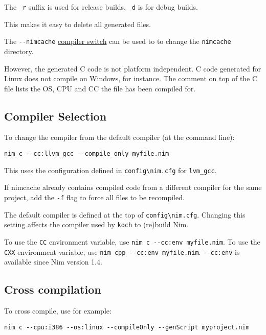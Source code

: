 The \texttt{\_r} suffix is used for release builds, \texttt{\_d} is for
debug builds.

This makes it easy to delete all generated files.

The \texttt{-\/-nimcache}
\protect\hyperlink{compiler-usage-command-line-switches}{compiler
switch} can be used to to change the \texttt{nimcache} directory.

However, the generated C code is not platform independent. C code
generated for Linux does not compile on Windows, for instance. The
comment on top of the C file lists the OS, CPU and CC the file has been
compiled for.

\hypertarget{compiler-selection}{%
\subsection{Compiler Selection}\label{compiler-selection}}

To change the compiler from the default compiler (at the command line):

\begin{verbatim}
nim c --cc:llvm_gcc --compile_only myfile.nim
\end{verbatim}

This uses the configuration defined in
\texttt{config\textbackslash{}nim.cfg} for \texttt{lvm\_gcc}.

If nimcache already contains compiled code from a different compiler for
the same project, add the \texttt{-f} flag to force all files to be
recompiled.

The default compiler is defined at the top of
\texttt{config\textbackslash{}nim.cfg}. Changing this setting affects
the compiler used by \texttt{koch} to (re)build Nim.

To use the \texttt{CC} environment variable, use
\texttt{nim\ c\ -\/-cc:env\ myfile.nim}. To use the \texttt{CXX}
environment variable, use \texttt{nim\ cpp\ -\/-cc:env\ myfile.nim}.
\texttt{-\/-cc:env} is available since Nim version 1.4.

\hypertarget{cross-compilation}{%
\subsection{Cross compilation}\label{cross-compilation}}

To cross compile, use for example:

\begin{verbatim}
nim c --cpu:i386 --os:linux --compileOnly --genScript myproject.nim
\end{verbatim}

